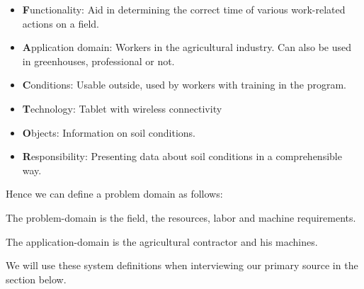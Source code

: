 \begin{itemize}[noitemsep]
    \item \textbf{F}unctionality: Aid in determining the correct time of various work-related actions on a field.
    \item \textbf{A}pplication domain: Workers in the agricultural industry. Can also be used in greenhouses, professional or not.
    \item \textbf{C}onditions: Usable outside, used by workers with training in the program.
    \item \textbf{T}echnology: Tablet with wireless connectivity
    \item \textbf{O}bjects: Information on soil conditions.
    \item \textbf{R}esponsibility: Presenting data about soil conditions in a comprehensible way.
\end{itemize}

Hence we can define a problem domain as follows:

The problem-domain is the field, the resources, labor and machine requirements.

The application-domain is the agricultural contractor and his machines.

We will use these system definitions when interviewing our primary source in the section below.  
